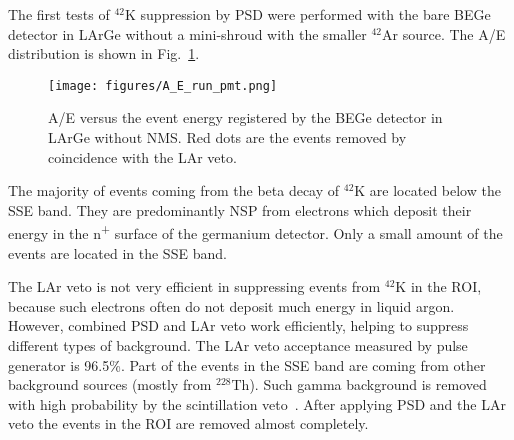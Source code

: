 \documentclass[twocolumn,epjc3]{svjour3}
\newcommand{\LArGe} {{{LArGe}\xspace}}
\newcommand{\I}[2]{$^{#1}$#2}
\newcommand{\ts}{\textsuperscript}
\begin{document}
The first tests of \I{42}{K} suppression by PSD were performed with the bare BEGe detector in \LArGe{} without a mini-shroud with the smaller \I{42}{Ar} source. The A/E distribution is shown in Fig.~\ref{fig:ae_pmt}.
%
\begin{figure}
\begin{center}
    \texttt{[image: figures/A\_E\_run\_pmt.png]}
     \caption{\label{fig:ae_pmt}A/E versus the event energy registered by the BEGe detector in \LArGe{} without NMS. Red dots are the events removed by coincidence with the LAr veto.}
\end{center}
\end{figure}
%
The majority of events coming from the beta decay of \I{42}{K} are located below the SSE band. They are predominantly NSP from electrons which deposit their energy in the n\ts{+} surface of the germanium detector. Only a small amount of the events are located in the SSE band. 

The LAr veto is not very efficient in suppressing events from \I{42}{K} in the ROI, because such electrons often do not deposit much energy in liquid argon. However, combined PSD and LAr veto work efficiently, helping to suppress different types of background. The LAr veto acceptance measured by pulse generator is 96.5\%. Part of the events in the SSE band are coming from other background sources (mostly from \I{228}{Th}). Such gamma background is removed with high probability by the scintillation veto~\cite{LArGe}. After applying PSD and the LAr veto the events in the ROI are removed almost completely.
\end{document}
